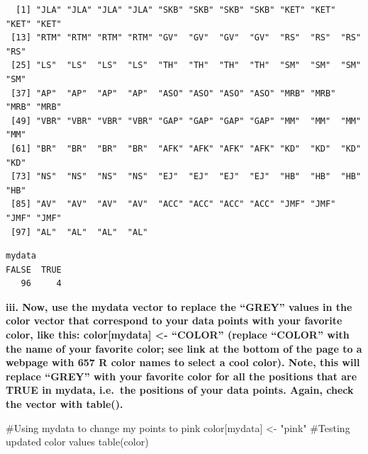 \documentclass[
  letterpaper,
  DIV=11,
  numbers=noendperiod]{scrartcl}
\newenvironment{Shaded}{\begin{snugshade}}{\end{snugshade}}
\newcommand{\CommentTok}[1]{\textcolor[rgb]{0.37,0.37,0.37}{#1}}
\newcommand{\FunctionTok}[1]{\textcolor[rgb]{0.28,0.35,0.67}{#1}}
\newcommand{\NormalTok}[1]{\textcolor[rgb]{0.00,0.23,0.31}{#1}}
\newcommand{\OtherTok}[1]{\textcolor[rgb]{0.00,0.23,0.31}{#1}}
\newcommand{\SpecialCharTok}[1]{\textcolor[rgb]{0.37,0.37,0.37}{#1}}
\newcommand{\StringTok}[1]{\textcolor[rgb]{0.13,0.47,0.30}{#1}}
\begin{document}
\begin{Shaded}
\end{Shaded}

\begin{verbatim}
  [1] "JLA" "JLA" "JLA" "JLA" "SKB" "SKB" "SKB" "SKB" "KET" "KET" "KET" "KET"
 [13] "RTM" "RTM" "RTM" "RTM" "GV"  "GV"  "GV"  "GV"  "RS"  "RS"  "RS"  "RS" 
 [25] "LS"  "LS"  "LS"  "LS"  "TH"  "TH"  "TH"  "TH"  "SM"  "SM"  "SM"  "SM" 
 [37] "AP"  "AP"  "AP"  "AP"  "ASO" "ASO" "ASO" "ASO" "MRB" "MRB" "MRB" "MRB"
 [49] "VBR" "VBR" "VBR" "VBR" "GAP" "GAP" "GAP" "GAP" "MM"  "MM"  "MM"  "MM" 
 [61] "BR"  "BR"  "BR"  "BR"  "AFK" "AFK" "AFK" "AFK" "KD"  "KD"  "KD"  "KD" 
 [73] "NS"  "NS"  "NS"  "NS"  "EJ"  "EJ"  "EJ"  "EJ"  "HB"  "HB"  "HB"  "HB" 
 [85] "AV"  "AV"  "AV"  "AV"  "ACC" "ACC" "ACC" "ACC" "JMF" "JMF" "JMF" "JMF"
 [97] "AL"  "AL"  "AL"  "AL" 
\end{verbatim}

\begin{Shaded}
\end{Shaded}

\begin{verbatim}
mydata
FALSE  TRUE 
   96     4 
\end{verbatim}

\textbf{iii. Now, use the mydata vector to replace the ``GREY'' values
in the color vector that correspond to your data points with your
favorite color, like this: color{[}mydata{]} \textless- ``COLOR''
(replace ``COLOR'' with the name of your favorite color; see link at the
bottom of the page to a webpage with 657 R color names to select a cool
color). Note, this will replace ``GREY'' with your favorite color for
all the positions that are TRUE in mydata, i.e.~the positions of your
data points. Again, check the vector with table().}

\begin{Shaded}
\begin{Highlighting}[]
\CommentTok{\#Using mydata to change my points to pink}
\NormalTok{color[mydata] }\OtherTok{\textless{}{-}} \StringTok{"pink"}
\CommentTok{\#Testing updated color values}
\FunctionTok{table}\NormalTok{(color)}
\end{Highlighting}
\end{Shaded}
\end{document}

